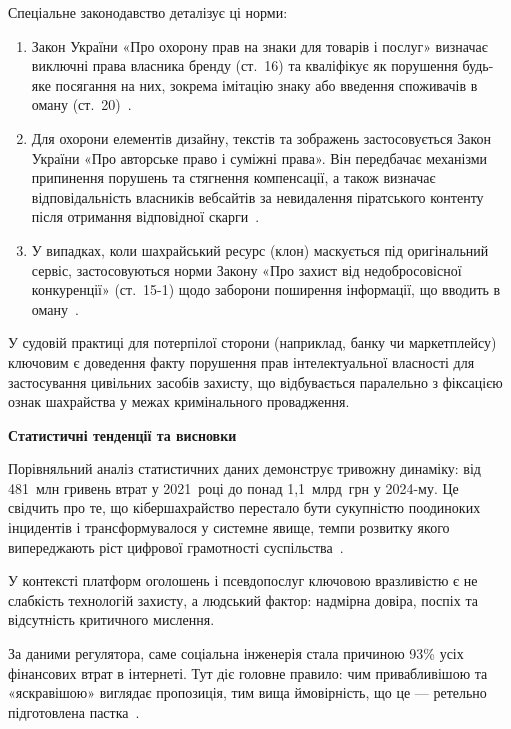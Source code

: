 \vspace{0.3cm}

Спеціальне законодавство деталізує ці норми:

\begin{enumerate}
    \item Закон України «Про охорону прав на знаки для товарів і послуг» визначає виключні права власника бренду (ст.~16) та кваліфікує як порушення будь-яке посягання на них, зокрема імітацію знаку або введення споживачів в оману (ст.~20)~\cite{LawTrademarks}.
    
    \item Для охорони елементів дизайну, текстів та зображень застосовується Закон України «Про авторське право і суміжні права». Він передбачає механізми припинення порушень та стягнення компенсації, а також визначає відповідальність власників вебсайтів за невидалення піратського контенту після отримання відповідної скарги~\cite{LawCopyright}.
    
    \item У випадках, коли шахрайський ресурс (клон) маскується під оригінальний сервіс, застосовуються норми Закону «Про захист від недобросовісної конкуренції» (ст.~15-1) щодо заборони поширення інформації, що вводить в оману~\cite{LawCompetition}.
\end{enumerate}

У судовій практиці для потерпілої сторони (наприклад, банку чи маркетплейсу) ключовим є доведення факту порушення прав інтелектуальної власності для застосування цивільних засобів захисту, що відбувається паралельно з фіксацією ознак шахрайства у межах кримінального провадження.

\vspace{0.3cm}
\noindent\textbf{Статистичні тенденції та висновки}

Порівняльний аналіз статистичних даних демонструє тривожну динаміку: від 481~млн гривень втрат у 2021~році до понад 1,1~млрд~грн у 2024-му. Це свідчить про те, що кібершахрайство перестало бути сукупністю поодиноких інцидентів і трансформувалося у системне явище, темпи розвитку якого випереджають ріст цифрової грамотності суспільства~\cite{NBU2025}.

У контексті платформ оголошень і псевдопослуг ключовою вразливістю є не слабкість технологій захисту, а людський фактор: надмірна довіра, поспіх та відсутність критичного мислення. 

За даними регулятора, саме соціальна інженерія стала причиною 93\% усіх фінансових втрат в інтернеті. Тут діє головне правило: чим привабливішою та «яскравішою» виглядає пропозиція, тим вища ймовірність, що це — ретельно підготовлена пастка~\cite{NBU2025}.

